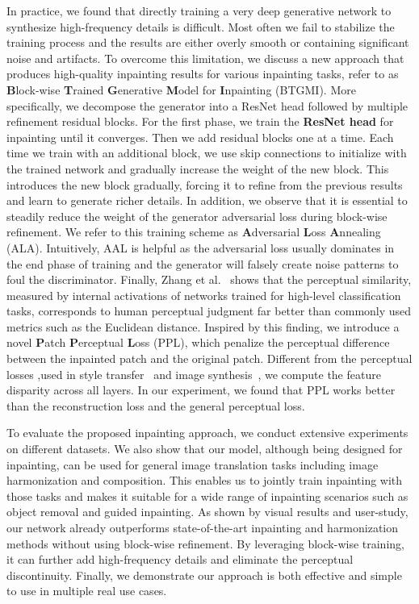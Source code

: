 \documentclass[runningheads]{llncs}
\begin{document}
In practice, we found that directly training a very deep generative network to synthesize high-frequency details is difficult. Most often we fail to stabilize the training process and the results are either overly smooth or containing significant noise and artifacts. To overcome this limitation, we discuss a new approach that produces high-quality inpainting results for various inpainting tasks, refer to as \textbf{B}lock-wise \textbf{T}rained \textbf{G}enerative \textbf{M}odel for \textbf{I}npainting (BTGMI). More specifically, we decompose the generator into a ResNet head followed by multiple refinement residual blocks. For the first phase, we train the \textbf{ResNet head} for inpainting until it converges. Then we add residual blocks one at a time. Each time we train with an additional block, we use skip connections to initialize with the trained network and gradually increase the weight of the new block. This introduces the new block gradually, forcing it to refine from the previous results and learn to generate richer details. In addition, we observe that it is essential to steadily reduce the weight of the generator adversarial loss during block-wise refinement. We refer to this training scheme as \textbf{A}dversarial \textbf{L}oss \textbf{A}nnealing (ALA).  Intuitively, AAL is helpful as the adversarial loss usually dominates in the end phase of training and the generator will falsely create noise patterns to foul the discriminator. Finally, Zhang et al.~\cite{zhang2018unreasonable} shows that the perceptual similarity, measured by internal activations of networks trained for high-level classification tasks, corresponds to human perceptual judgment far better than commonly used metrics such as the Euclidean distance. Inspired by this finding, we introduce a novel \textbf{P}atch \textbf{P}erceptual \textbf{L}oss (PPL), which penalize the perceptual difference between the inpainted patch and the original patch. Different from the perceptual losses ,used in style transfer~\cite{johnson2016perceptual,gatys2016image} and image synthesis~\cite{dosovitskiy2016generating,chen2017photographic}, we compute the feature disparity across all layers. In our experiment, we found that PPL works better than the reconstruction loss and the general perceptual loss. 

To evaluate the proposed inpainting approach, we conduct extensive experiments on different datasets. We also show that our model, although being designed for inpainting, can be used for general image translation tasks including image harmonization and composition. This enables us to jointly train inpainting with those tasks and makes it suitable for a wide range of inpainting scenarios such as object removal and guided inpainting. As shown by visual results and user-study, our network already outperforms state-of-the-art inpainting and harmonization methods without using block-wise refinement. By leveraging block-wise training, it can further add high-frequency details and eliminate the perceptual discontinuity. Finally, we demonstrate our approach is both effective and simple to use in multiple real use cases.
\end{document}
